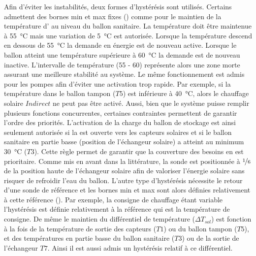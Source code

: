 Afin d’éviter les instabilités, deux formes d’hystérésis sont utilisés. Certains admettent des bornes
min et max fixes () comme pour le maintien de la température
d’ au niveau du ballon sanitaire. La température doit être maintenue à \SI{55}{\celsius}
mais une variation de \SI{5}{\celsius} est autorisée. Lorsque la température descend en dessous de
\SI{55}{\celsius} la demande en énergie est de nouveau active. Lorsque le ballon atteint une
température supérieure à \SI{60}{\celsius} la demande est de nouveau inactive.
L’intervalle de température (\num{55} - \num{60}) représente alors une zone morte assurant
une meilleure stabilité au système. Le même fonctionnement est admis pour les pompes
afin d’éviter une activation trop rapide.
Par exemple, si la température dans le ballon tampon ($T5$) est inférieure à \SI{40}{\celsius},
alors le chauffage solaire $Indirect$ ne peut pas être activé. Aussi, bien que le système
puisse remplir plusieurs fonctions concurrentes, certaines contraintes permettent de
garantir l’ordre des priorités. L’activation de la charge du ballon de stockage est ainsi
seulement autorisée si la  est ouverte vers les capteurs solaires et si le ballon
sanitaire en partie basse (position de l’échangeur solaire) a atteint au minimum
\SI{30}{\celsius} ($T3$). Cette règle permet de garantir que la couverture des besoins en
 est prioritaire. Comme mis en avant dans la littérature, la sonde est positionnée
à $\nicefrac{1}{6}$ de la position haute de l’échangeur solaire afin de valoriser
l’énergie solaire sans risquer de refroidir l’eau du ballon.
L’autre type d’hystérésis nécessite le retour d’une sonde de référence et les bornes
min et max sont alors définies relativement à cette référence (). Par exemple, la consigne
de chauffage étant variable l’hystérésis est définie relativement à la référence
qui est la température de consigne. De même
le maintien du différentiel de température ($\Delta T_{sol}$) est fonction à la fois
de la température de sortie des capteurs ($T1$) ou du ballon tampon ($T5$), et des
températures en partie basse du ballon sanitaire ($T3$) ou de la sortie de l’échangeur
$T7$. Ainsi il est aussi admis un hystérésis relatif à ce différentiel.

